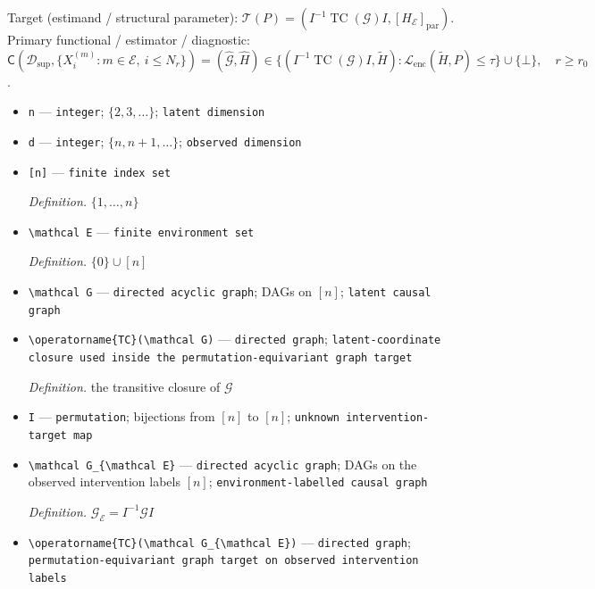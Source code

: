 \documentclass{article}
\begin{document}
Target (estimand / structural parameter): \(\mathcal T(P)=(I^{-1}\operatorname{TC}(\mathcal G)I,[H_{\mathcal E}]_{\mathrm{par}})\).
Primary functional / estimator / diagnostic: \(\mathsf C(\mathcal D_{\mathrm{sup}},\{X_i^{(m)}:m\in\mathcal E,\ i\le N_r\})=(\widehat{\mathcal G},\widehat H)\in\{(I^{-1}\operatorname{TC}(\mathcal G)I,\widetilde H):\mathcal L_{\mathrm{enc}}(\widetilde H,P)\le\tau\}\cup\{\bot\},\quad r\ge r_0\).
\begin{itemize}
  \item \texttt{n} --- \texttt{integer}; \(\{2,3,\ldots\}\); \texttt{latent dimension}
  \item \texttt{d} --- \texttt{integer}; \(\{n,n+1,\ldots\}\); \texttt{observed dimension}
  \item \texttt{[n]} --- \texttt{finite index set}
  \par\smallskip\noindent\emph{Definition.} \(\{1,\ldots,n\}\)
  \item \texttt{\textbackslash{}\allowbreak{}mathcal E} --- \texttt{finite environment set}
  \par\smallskip\noindent\emph{Definition.} \(\{0\}\cup[n]\)
  \item \texttt{\textbackslash{}\allowbreak{}mathcal G} --- \texttt{directed acyclic graph}; DAGs on \([n]\); \texttt{latent causal graph}
  \item \texttt{\textbackslash{}\allowbreak{}operatorname\{TC\}\allowbreak{}(\textbackslash{}\allowbreak{}mathcal G)} --- \texttt{directed graph}; \texttt{latent-\allowbreak{}coordinate closure used inside the permutation-\allowbreak{}equivariant graph target}
  \par\smallskip\noindent\emph{Definition.} the transitive closure of \(\mathcal G\)
  \item \texttt{I} --- \texttt{permutation}; bijections from \([n]\) to \([n]\); \texttt{unknown intervention-\allowbreak{}target map}
  \item \texttt{\textbackslash{}\allowbreak{}mathcal G\_\allowbreak{}\{\textbackslash{}\allowbreak{}mathcal E\}\allowbreak{}} --- \texttt{directed acyclic graph}; DAGs on the observed intervention labels \([n]\); \texttt{environment-\allowbreak{}labelled causal graph}
  \par\smallskip\noindent\emph{Definition.} \(\mathcal G_{\mathcal E}=I^{-1}\mathcal G I\)
  \item \texttt{\textbackslash{}\allowbreak{}operatorname\{TC\}\allowbreak{}(\textbackslash{}\allowbreak{}mathcal G\_\allowbreak{}\{\textbackslash{}\allowbreak{}mathcal E\}\allowbreak{})} --- \texttt{directed graph}; \texttt{permutation-\allowbreak{}equivariant graph target on observed intervention labels}

\end{itemize}
\end{document}
